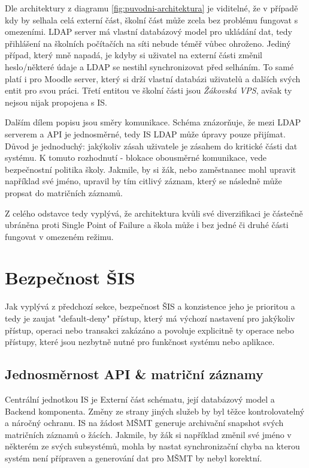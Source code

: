 \documentclass[FM,Proj]{tulthesis}
\begin{document}
Dle architektury z diagramu \ref{fig:puvodni-architektura} je viditelné, že v případě kdy by selhala celá externí část,
školní část může zcela bez problému fungovat s omezeními. LDAP server má vlastní databázový model pro ukládání dat, tedy
přihlášení na školních počítačích na síti nebude téměř vůbec ohroženo. Jediný případ, který mně napadá, je kdyby si uživatel
na externí části změnil heslo/některé údaje a LDAP se nestihl synchronizovat před selháním. To samé platí i pro Moodle
server, který si drží vlastní databázi uživatelů a dalších svých entit pro svou práci.
Třetí entitou ve školní části jsou \textit{Žákovská VPS}, avšak ty nejsou nijak propojena s IS.

Dalším dílem popisu jsou směry komunikace. Schéma znázorňuje, že mezi LDAP serverem a API je jednosměrné, tedy IS
LDAP může úpravy pouze přijímat. Důvod je jednoduchý: jakýkoliv zásah uživatele je zásahem do kritické části 
dat systému. K tomuto rozhodnutí - blokace obousměrné komunikace, vede bezpečnostní politika školy. Jakmile,
by si žák, nebo zaměstnanec mohl upravit například své jméno, upravil by tím citlivý záznam, který se následně
může propsat do matričních záznamů.

Z celého odstavce tedy vyplývá, že architektura kvůli své diverzifikaci je částečně ubráněna proti Single Point of Failure
a škola může i bez jedné či druhé části fungovat v omezeném režimu.

\section{Bezpečnost ŠIS}
\label{section:bezpecnost-sis}
Jak vyplývá z předchozí sekce, bezpečnost ŠIS a konzistence jeho je prioritou a tedy je
zaujat "default-deny" přístup, který má výchozí nastavení pro jakýkoliv přístup, operaci
nebo transakci zakázáno a povoluje explicitně ty operace nebo přístupy, které jsou
nezbytně nutné pro funkčnost systému nebo aplikace.

\subsection*{Jednosměrnost API \& matriční záznamy}  
\label{section:jednosmernost-api-a-matricni-zaznamy}
Centrální jednotkou IS je Externí část schématu, její databázový model a Backend komponenta. Změny ze strany 
jiných služeb by byl těžce kontrolovatelný a náročný ochranu. IS na žádost MŠMT generuje archivační snapshot
svých matričních záznamů o žácích. Jakmile, by žák si například změnil své jméno v některém ze svých subsystémů,
mohla by nastat synchronizační chyba na kterou systém není přípraven a generování dat pro MŠMT by nebyl korektní.
\end{document}
